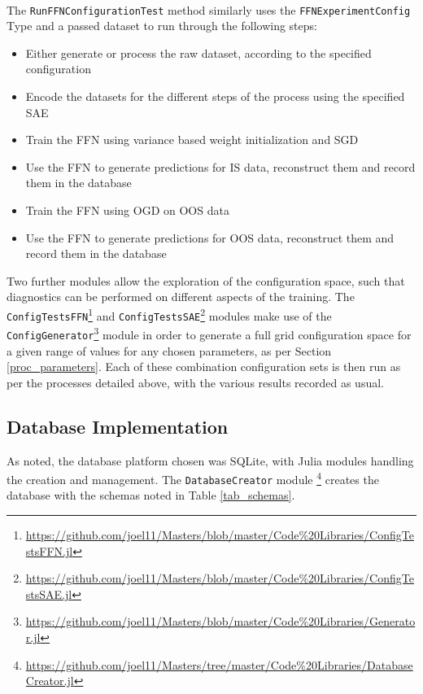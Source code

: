 \documentclass[a4paper,11pt,oneside]{article}
\theoremstyle{plain}
\theoremstyle{definition}
\begin{document}
	~\\
	The \texttt{RunFFNConfigurationTest} method similarly uses the \texttt{FFNExperimentConfig} Type and a passed dataset to run through the following steps:
	\begin{itemize}
		\item[1] Either generate or process the raw dataset, according to the specified configuration
		\item[2] Encode the datasets for the different steps of the process using the specified SAE
		\item[3] Train the FFN using variance based weight initialization and SGD
		\item[4] Use the FFN to generate predictions for IS data, reconstruct them and record them in the database
		\item[5] Train the FFN using OGD on OOS data
		\item[6] Use the FFN to generate predictions for OOS data, reconstruct them and record them in the database
	\end{itemize}
	
	Two further modules allow the exploration of the configuration space, such that diagnostics can be performed on different aspects of the training. 	The \texttt{ConfigTestsFFN}\footnote{\url{https://github.com/joel11/Masters/blob/master/Code\%20Libraries/ConfigTestsFFN.jl}} and \texttt{ConfigTestsSAE}\footnote{\url{https://github.com/joel11/Masters/blob/master/Code\%20Libraries/ConfigTestsSAE.jl}} modules make use of the \texttt{ConfigGenerator}\footnote{\url{https://github.com/joel11/Masters/blob/master/Code\%20Libraries/Generator.jl}} module in order to generate a full grid configuration space for a given range of values for any chosen parameters, as per Section \ref{proc_parameters}. Each of these combination configuration sets is then run as per the processes detailed above, with the various results recorded as usual. 
	
	\subsection{Database Implementation}
	
	As noted, the database platform chosen was SQLite, with Julia modules handling the creation and management. The \texttt{DatabaseCreator} module \footnote{\url{https://github.com/joel11/Masters/tree/master/Code\%20Libraries/DatabaseCreator.jl}} creates the database with the schemas noted in Table \ref{tab_schemas}.\newline
	
\end{document}
